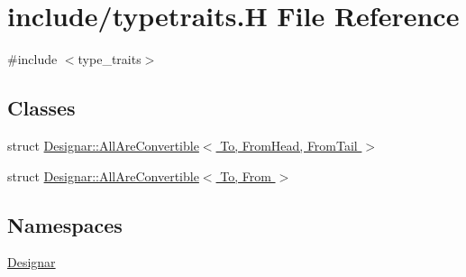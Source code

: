 \hypertarget{typetraits_8_h}{}\section{include/typetraits.H File Reference}
\label{typetraits_8_h}
{\ttfamily \#include $<$type\+\_\+traits$>$}\newline
\subsection*{Classes}
\begin{DoxyCompactItemize}
\item 
struct \hyperlink{struct_designar_1_1_all_are_convertible}{Designar\+::\+All\+Are\+Convertible$<$ To, From\+Head, From\+Tail $>$}
\item 
struct \hyperlink{struct_designar_1_1_all_are_convertible_3_01_to_00_01_from_01_4}{Designar\+::\+All\+Are\+Convertible$<$ To, From $>$}
\end{DoxyCompactItemize}
\subsection*{Namespaces}
\begin{DoxyCompactItemize}
\item 
 \hyperlink{namespace_designar}{Designar}
\end{DoxyCompactItemize}
